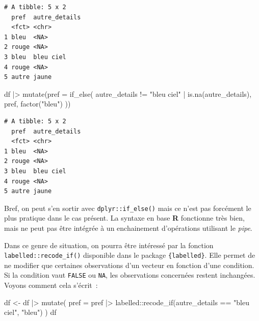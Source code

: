 \documentclass[
  letterpaper,
  DIV=11,
  numbers=noendperiod,
  oneside]{scrreprt}
\newenvironment{Shaded}{\begin{snugshade}}{\end{snugshade}}
\newcommand{\AttributeTok}[1]{\textcolor[rgb]{0.40,0.45,0.13}{#1}}
\newcommand{\FunctionTok}[1]{\textcolor[rgb]{0.28,0.35,0.67}{#1}}
\newcommand{\NormalTok}[1]{\textcolor[rgb]{0.00,0.23,0.31}{#1}}
\newcommand{\OtherTok}[1]{\textcolor[rgb]{0.00,0.23,0.31}{#1}}
\newcommand{\SpecialCharTok}[1]{\textcolor[rgb]{0.37,0.37,0.37}{#1}}
\newcommand{\StringTok}[1]{\textcolor[rgb]{0.13,0.47,0.30}{#1}}
\begin{document}
\begin{verbatim}
# A tibble: 5 x 2
  pref  autre_details
  <fct> <chr>        
1 bleu  <NA>         
2 rouge <NA>         
3 bleu  bleu ciel    
4 rouge <NA>         
5 autre jaune        
\end{verbatim}

\begin{Shaded}
\begin{Highlighting}[]
\NormalTok{df }\SpecialCharTok{|\textgreater{}} 
  \FunctionTok{mutate}\NormalTok{(}\AttributeTok{pref =} \FunctionTok{if\_else}\NormalTok{(}
\NormalTok{    autre\_details }\SpecialCharTok{!=} \StringTok{"bleu ciel"} \SpecialCharTok{|} \FunctionTok{is.na}\NormalTok{(autre\_details), }
\NormalTok{    pref, }
    \FunctionTok{factor}\NormalTok{(}\StringTok{"bleu"}\NormalTok{)}
\NormalTok{  ))}
\end{Highlighting}
\end{Shaded}

\begin{verbatim}
# A tibble: 5 x 2
  pref  autre_details
  <fct> <chr>        
1 bleu  <NA>         
2 rouge <NA>         
3 bleu  bleu ciel    
4 rouge <NA>         
5 autre jaune        
\end{verbatim}

Bref, on peut s'en sortir avec \texttt{dplyr::if\_else()} mais ce n'est
pas forcément le plus pratique dans le cas présent. La syntaxe en base
\textbf{R} fonctionne très bien, mais ne peut pas être intégrée à un
enchainement d'opérations utilisant le \emph{pipe}.

Dans ce genre de situation, on pourra être intéressé par la fonction
\texttt{labelled::recode\_if()} disponible dans le package
\texttt{\{labelled\}}. Elle permet de ne modifier que certaines
observations d'un vecteur en fonction d'une condition. Si la condition
vaut \texttt{FALSE} ou \texttt{NA}, les observations concernées restent
inchangées. Voyons comment cela s'écrit~:

\begin{Shaded}
\begin{Highlighting}[]
\NormalTok{df }\OtherTok{\textless{}{-}}
\NormalTok{  df }\SpecialCharTok{|\textgreater{}} 
  \FunctionTok{mutate}\NormalTok{(}
    \AttributeTok{pref =}\NormalTok{ pref }\SpecialCharTok{|\textgreater{}} 
\NormalTok{      labelled}\SpecialCharTok{::}\FunctionTok{recode\_if}\NormalTok{(autre\_details }\SpecialCharTok{==} \StringTok{"bleu ciel"}\NormalTok{, }\StringTok{"bleu"}\NormalTok{)}
\NormalTok{  )}
\NormalTok{df}
\end{Highlighting}
\end{Shaded}
\end{document}

